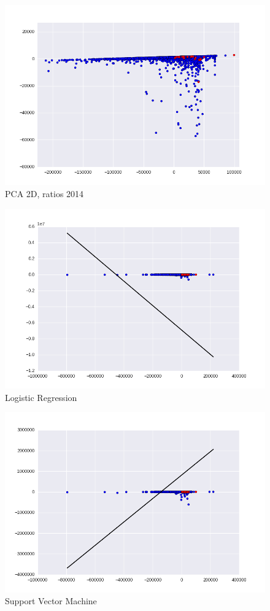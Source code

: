 \documentclass[DIV=calc, paper=a4, fontsize=11pt, twocolumn]{scrartcl}
\begin{document}
\begin{figure}
  \centering
    \includegraphics[width=\linewidth]{pca2D}
  \caption{PCA 2D, ratios 2014}
  \label{fig:pca2D}
\end{figure}
\begin{figure}
  \centering
    \includegraphics[width=\linewidth]{elog}
  \caption{Logistic Regression}
  \label{fig:elog}
\end{figure}
\begin{figure}
  \centering
    \includegraphics[width=\linewidth]{esvm}
  \caption{Support Vector Machine}
  \label{fig:esvm}
\end{figure}
\end{document}
